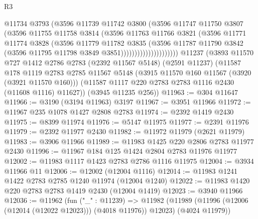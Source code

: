\begin{lexlean}{R3}
\begin{coremodule}
                              @11734
                              @3793
                              (@3596
                                @11739
                                @11742
                                @3800
                                (@3596
                                  @11747
                                  @11750
                                  @3807
                                  (@3596
                                    @11755
                                    @11758
                                    @3814
                                    (@3596
                                      @11763
                                      @11766
                                      @3821
                                      (@3596
                                        @11771
                                        @11774
                                        @3828
                                        (@3596
                                          @11779
                                          @11782
                                          @3835
                                          (@3596
                                            @11787
                                            @11790
                                            @3842
                                            (@3596 @11795 @11798 @3849 @3851)))))))))))))))))))))
    @11237
    (@3893
      @11570
      @727
      @1412
      @2786
      @2783
      (@2392 @11567 @5148)
      (@2591 @11237)
      (@11587
        @178
        @1119
        @2783
        @2785
        @11567
        @5148
        (@3915 @11570 @160 @11567 (@3920 (@3921 @11570 @160)))
        (@11587 @1117 @220 @2783 @2783 @1116 @2430 (@11608 @1116) @11627))
      (@3945 @11235 @256))
@11963 := @304 @11647
@11966 := @3190 (@3194 @11963) @3197
@11967 := @3951 @11966
@11972 := @11967 @235 @1078 @1427 @2808 @2783
@11974 := @2392 @1419 @2430
@11975 := @8399 @11974
@11976 := @5147 @11975
@11977 := @2391 @11976
@11979 := @2392 @11977 @2430
@11982 := @11972 @11979 (@2621 @11979)
@11983 := @3906 @11966
@11989 := @11983 @1425 @220 @2806 @2783 @11977 @2430
@11996 := @11967 @184 @125 @1424 @2804 @2783 @11976 @11977
@12002 := @11983 @1117 @1423 @2783 @2786 @1116 @11975
@12004 := @3934 @11966 @11
@12006 := @12002 (@12004 @1116)
@12014 := @11983 @1241 @1422 @2783 @2785 @1240 @11974 (@12004 @1240)
@12022 := @11983 @1420 @220 @2783 @2783 @1419 @2430 (@12004 @1419)
@12023 := @3940 @11966
@12036 := @11962
    (fun ("_" : @11239) =>
    @11982 (@11989 (@11996 (@12006 (@12014 (@12022 @12023))) (@4018 @11976)) @12023) (@4024 @11979))

\end{coremodule}
\end{lexlean}
